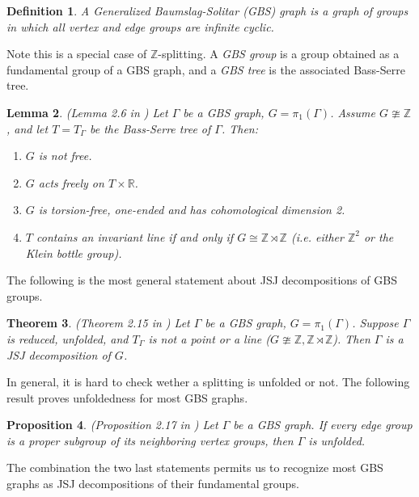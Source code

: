 \documentclass[12pt]{amsart}
\newtheorem{theorem}{Theorem}[section]
\newtheorem{lemma}[theorem]{Lemma}
\newtheorem{proposition}[theorem]{Proposition}
\newtheorem{definition}[theorem]{Definition}
\newcommand{\Z}{\mathbb{Z}}
\newcommand{\R}{\mathbb{R}}
\begin{document}

\begin{definition} A {\em Generalized Baumslag-Solitar (GBS) graph} is a graph of groups in which all vertex and edge groups are infinite cyclic.
\end{definition}

Note this is a special case of $\Z$-splitting. A {\em GBS group} is a group obtained as a fundamental group of a GBS graph, and a {\em GBS tree} is the associated Bass-Serre tree. 

\begin{lemma} \label{forester-prep} (Lemma 2.6 in \cite{forester}) Let $\Gamma$ be a GBS graph, $G=\pi_1(\Gamma)$. Assume $G\ncong\Z$, and let $T=T_{\Gamma}$ be the Bass-Serre tree of $\Gamma$. Then:
\begin{enumerate}
\item $G$ is not free.
\item $G$ acts freely on $T\times\R$.
\item $G$ is torsion-free, one-ended and has cohomological dimension 2.
\item $T$ contains an invariant line if and only if $G\cong \Z \rtimes \Z$ (i.e. either $\Z^2$ or the Klein bottle group).
\end{enumerate} 
\end{lemma}

The following is the most general statement about JSJ decompositions of GBS groups.

\begin{theorem} \label{forester-jsj} (Theorem 2.15 in \cite{forester}) Let $\Gamma$ be a GBS graph, $G=\pi_1(\Gamma)$. Suppose $\Gamma$ is reduced, unfolded, and $T_{\Gamma}$ is not a point or a line ($G\ncong \Z,\Z\rtimes\Z$). Then $\Gamma$ is a JSJ decomposition of $G$.
\end{theorem}

In general, it is hard to check wether a splitting is unfolded or not. The following result proves unfoldedness for most GBS graphs.

\begin{proposition} \label{forester-unf} (Proposition 2.17 in \cite{forester}) Let $\Gamma$ be a GBS graph. If every edge group is a proper subgroup of its neighboring vertex groups, then $\Gamma$ is unfolded.
\end{proposition}

The combination the two last statements permits us to recognize most GBS graphs as JSJ decompositions of their fundamental groups.
\end{document}
